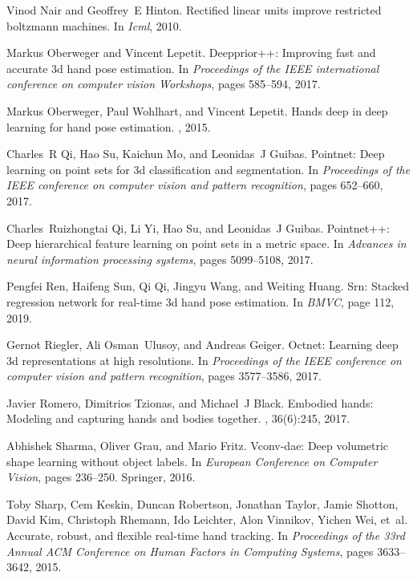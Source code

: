 \documentclass[10pt,twocolumn,letterpaper]{article}
\begin{document}
\begin{thebibliography}{10}
Vinod Nair and Geoffrey~E Hinton.
\newblock Rectified linear units improve restricted boltzmann machines.
\newblock In {\em Icml}, 2010.

Markus Oberweger and Vincent Lepetit.
\newblock Deepprior++: Improving fast and accurate 3d hand pose estimation.
\newblock In {\em Proceedings of the IEEE international conference on computer
  vision Workshops}, pages 585--594, 2017.

Markus Oberweger, Paul Wohlhart, and Vincent Lepetit.
\newblock Hands deep in deep learning for hand pose estimation.
, 2015.

Charles~R Qi, Hao Su, Kaichun Mo, and Leonidas~J Guibas.
\newblock Pointnet: Deep learning on point sets for 3d classification and
  segmentation.
\newblock In {\em Proceedings of the IEEE conference on computer vision and
  pattern recognition}, pages 652--660, 2017.

Charles~Ruizhongtai Qi, Li Yi, Hao Su, and Leonidas~J Guibas.
\newblock Pointnet++: Deep hierarchical feature learning on point sets in a
  metric space.
\newblock In {\em Advances in neural information processing systems}, pages
  5099--5108, 2017.

Pengfei Ren, Haifeng Sun, Qi Qi, Jingyu Wang, and Weiting Huang.
\newblock Srn: Stacked regression network for real-time 3d hand pose
  estimation.
\newblock In {\em BMVC}, page 112, 2019.

Gernot Riegler, Ali Osman~Ulusoy, and Andreas Geiger.
\newblock Octnet: Learning deep 3d representations at high resolutions.
\newblock In {\em Proceedings of the IEEE conference on computer vision and
  pattern recognition}, pages 3577--3586, 2017.

Javier Romero, Dimitrios Tzionas, and Michael~J Black.
\newblock Embodied hands: Modeling and capturing hands and bodies together.
, 36(6):245, 2017.

Abhishek Sharma, Oliver Grau, and Mario Fritz.
\newblock Vconv-dae: Deep volumetric shape learning without object labels.
\newblock In {\em European Conference on Computer Vision}, pages 236--250.
  Springer, 2016.

Toby Sharp, Cem Keskin, Duncan Robertson, Jonathan Taylor, Jamie Shotton, David
  Kim, Christoph Rhemann, Ido Leichter, Alon Vinnikov, Yichen Wei, et~al.
\newblock Accurate, robust, and flexible real-time hand tracking.
\newblock In {\em Proceedings of the 33rd Annual ACM Conference on Human
  Factors in Computing Systems}, pages 3633--3642, 2015.


\end{thebibliography}
\end{document}
